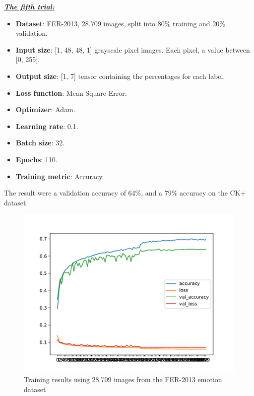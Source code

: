 \documentclass[runningheads,a4paper,11pt]{report}
\begin{document}
\clearpage
\underline{\textbf{\emph{The fifth trial:}}}
\begin{itemize}
	\item \textbf{Dataset}: FER-2013, 28.709 images, split into 80\% training and 20\% validation.
	\item \textbf{Input size}: [1, 48, 48, 1] grayscale pixel images. Each pixel, a value between [0, 255].
	\item \textbf{Output size}: [1, 7] tensor containing the percentages for each label.
	\item \textbf{Loss function}: Mean Square Error.
	\item \textbf{Optimizer}: Adam.
	\item \textbf{Learning rate}: 0.1.
	\item \textbf{Batch size}: 32.
	\item \textbf{Epochs}: 110.
	\item \textbf{Training metric}: Accuracy.
\end{itemize}
The result were a validation accuracy of 64\%, and a 79\% accuracy on the CK+ dataset.
\begin{figure}[htbp]
\begin{center}
	\includegraphics[scale=0.8]{Fig/fer_training_28k_01_mean_square.pdf}
	\caption{Training results using 28.709 images from the FER-2013 emotion dataset}
	\label{fer_training_28k_01_mean_square}
\end{center}
\end{figure}
\end{document}
